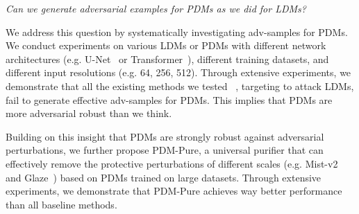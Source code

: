 \documentclass{article}
\newcommand{\chen}[1]{{\color{cyan}{#1}}}
\begin{document}
\begin{center}
    \textit{Can we generate adversarial examples for PDMs as we did for LDMs?}
\end{center}


%

We address this question by systematically investigating adv-samples for PDMs. We conduct experiments on various LDMs or PDMs with different network architectures (e.g. U-Net~\cite{ddpm} or Transformer~\cite{dit}), different training datasets, and different input resolutions (e.g. 64, 256, 512). Through extensive experiments, we demonstrate that all the existing methods we tested ~\citep{liang2023mist,mist-v2, glaze, sdsattack, chen2024smoothattack, salman2023raising, advdm}, targeting to attack LDMs, fail to generate effective adv-samples for PDMs. This implies that PDMs are more adversarial robust than we think. 


Building on this insight that PDMs are strongly robust against adversarial perturbations, we further propose PDM-Pure, a universal purifier that can effectively remove the protective perturbations of different scales (e.g. Mist-v2~\cite{mist-v2} and Glaze~\cite{glaze}) based on PDMs trained on large datasets. Through extensive experiments, we demonstrate that PDM-Pure achieves way better performance than all baseline methods.

\end{document}
